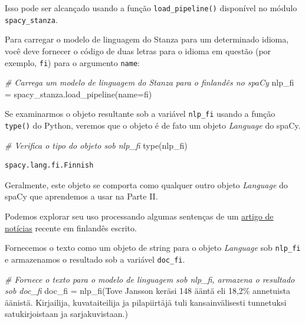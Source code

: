 \documentclass[
  brazilian,
]{article}
\newenvironment{Shaded}{}{}
\newcommand{\BuiltInTok}[1]{#1}
\newcommand{\CommentTok}[1]{\textcolor[rgb]{0.38,0.63,0.69}{\textit{#1}}}
\newcommand{\NormalTok}[1]{#1}
\newcommand{\OperatorTok}[1]{\textcolor[rgb]{0.40,0.40,0.40}{#1}}
\newcommand{\StringTok}[1]{\textcolor[rgb]{0.25,0.44,0.63}{#1}}
\begin{document}
Isso pode ser alcançado usando a função \texttt{load\_pipeline()}
disponível no módulo \texttt{spacy\_stanza}.

Para carregar o modelo de linguagem do Stanza para um determinado
idioma, você deve fornecer o código de duas letras para o idioma em
questão (por exemplo, \texttt{fi}) para o argumento \texttt{name}:

\begin{Shaded}
\begin{Highlighting}[]
\CommentTok{\# Carrega um modelo de linguagem do Stanza para o finlandês no spaCy}
\NormalTok{nlp\_fi }\OperatorTok{=}\NormalTok{ spacy\_stanza.load\_pipeline(name}\OperatorTok{=}\StringTok{\textquotesingle{}fi\textquotesingle{}}\NormalTok{)}
\end{Highlighting}
\end{Shaded}

Se examinarmos o objeto resultante sob a variável \texttt{nlp\_fi}
usando a função \texttt{type()} do Python, veremos que o objeto é de
fato um objeto \emph{Language} do spaCy.

\begin{Shaded}
\begin{Highlighting}[]
\CommentTok{\# Verifica o tipo do objeto sob \textquotesingle{}nlp\_fi\textquotesingle{}}
\BuiltInTok{type}\NormalTok{(nlp\_fi)}
\end{Highlighting}
\end{Shaded}

\begin{verbatim}
spacy.lang.fi.Finnish
\end{verbatim}

Geralmente, este objeto se comporta como qualquer outro objeto
\emph{Language} do spaCy que aprendemos a usar na Parte II.

Podemos explorar seu uso processando algumas sentenças de um
\href{https://yle.fi/aihe/artikkeli/2021/03/08/yleiso-aanesti-tarja-halonen-on-inspiroivin-nainen-karkikolmikkoon-ylsivat-myos}{artigo
de notícias} recente em finlandês escrito.

Fornecemos o texto como um objeto de string para o objeto
\emph{Language} sob \texttt{nlp\_fi} e armazenamos o resultado sob a
variável \texttt{doc\_fi}.

\begin{Shaded}
\begin{Highlighting}[]
\CommentTok{\# Fornece o texto para o modelo de linguagem sob \textquotesingle{}nlp\_fi\textquotesingle{}, armazena o resultado sob \textquotesingle{}doc\_fi\textquotesingle{}}
\NormalTok{doc\_fi }\OperatorTok{=}\NormalTok{ nlp\_fi(}\StringTok{\textquotesingle{}Tove Jansson keräsi 148 ääntä eli 18,2\% annetuista äänistä. Kirjailija, kuvataiteilija ja pilapiirtäjä tuli kansainvälisesti tunnetuksi satukirjoistaan ja sarjakuvistaan.\textquotesingle{}}\NormalTok{)}
\end{Highlighting}
\end{Shaded}
\end{document}
